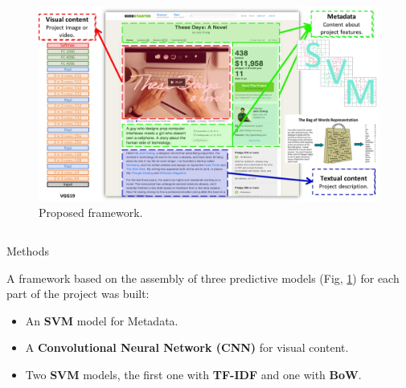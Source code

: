 \documentclass[final]{beamer}
\newlength{\onecolwid}
\newlength{\twocolwid}
\begin{document}
\begin{frame}[t]
\begin{columns}[t]
\begin{column}{\twocolwid}
		\begin{figure}
			\hspace*{3in}
			\includegraphics[width=0.97\linewidth]{prototipo.jpg}
			\caption{Proposed framework.}
			\label{figfram}
			\hspace*{-3in}
		\end{figure}

		
		\begin{columns}[t,totalwidth=\twocolwid] %
		
		
		\begin{column}{\onecolwid}\vspace{-.6in} %
			
			
			\begin{block}{Methods}
				
					A framework based on the assembly of three predictive models (Fig, \ref{figfram}) for each part of the project was built:
					\begin{itemize}
						\item An \textbf{SVM} model for Metadata.
						\item A \textbf{Convolutional Neural Network (CNN)} for visual content.
						\item Two \textbf{SVM} models, the first one with \textbf{TF-IDF} and one with \textbf{BoW}.
					\end{itemize}
				
			\end{block}
			
			

\end{column}
\end{columns}
\end{column}
\end{columns}
\end{frame}
\end{document}

